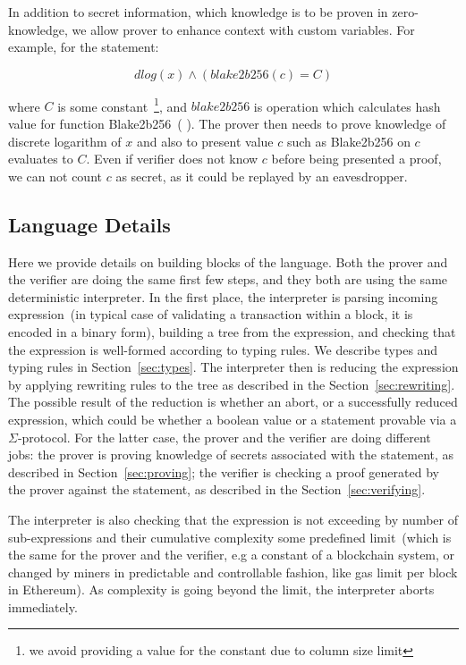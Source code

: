 \documentclass[11pt]{article}
\newcommand{\authnote}[2]{\marginpar{\parbox{\marginparwidth}{\tiny %
  \textsf{#1 {\textcolor{blue}{notes: #2}}}}}%
  \textcolor{blue}{\textbf{\dag}}}
\newcommand{\authnote}[2]{
  \textsf{#1 \textcolor{blue}{: #2}}}
\newcommand{\authnote}[2]{}
\newcommand{\knote}[1]{{\authnote{\textcolor{green}{kushti notes}}{#1}}}
\begin{document}
In addition to secret information, which knowledge is to be proven in zero-knowledge, we allow prover to enhance context with custom variables. For example, for the statement:

$$dlog(x) \land (blake2b256(c) = C)$$

where $C$ is some constant~\footnote{we avoid providing a value for the constant due to column size limit}, and $blake2b256$ is operation which calculates hash value for function Blake2b256~(\knote{link}). The prover then needs to prove knowledge of discrete logarithm of $x$ and also to present value $c$ such as Blake2b256 on $c$ evaluates to $C$. Even if verifier does not know $c$ before being presented a proof, we can not count $c$ as secret, as it could be replayed by an eavesdropper.



\subsection{Language Details} 
\label{sec:lang-details}

Here we provide details on building blocks of the language.  
Both the prover and the verifier are doing the same first few steps, and they both are using the same deterministic interpreter. In the first place, the interpreter is parsing incoming expression~(in typical case of validating a transaction within a block, it is encoded in a binary form), building a tree from the expression, and checking that the expression is well-formed according to typing rules. We describe types and typing rules in Section~\ref{sec:types}. The interpreter then is reducing the expression by applying rewriting rules to the tree as described in the Section~\ref{sec:rewriting}. The possible result of the reduction is whether an abort, or a successfully reduced expression, which could be whether a boolean value or a statement provable via a $\Sigma$-protocol. For the latter case, the prover and the verifier are doing different jobs: the prover is proving knowledge of secrets associated with the statement, as described in Section~\ref{sec:proving}; the verifier is checking a proof generated by the prover against the statement, as described in the Section~\ref{sec:verifying}.   

The interpreter is also checking that the expression is not exceeding by number of sub-expressions and their cumulative complexity some predefined limit~(which is the same for the prover and the verifier, e.g a constant of a blockchain system, or changed by miners in predictable and controllable fashion, like gas limit per block in Ethereum). As complexity is going beyond the limit, the interpreter aborts immediately. 
\end{document}
